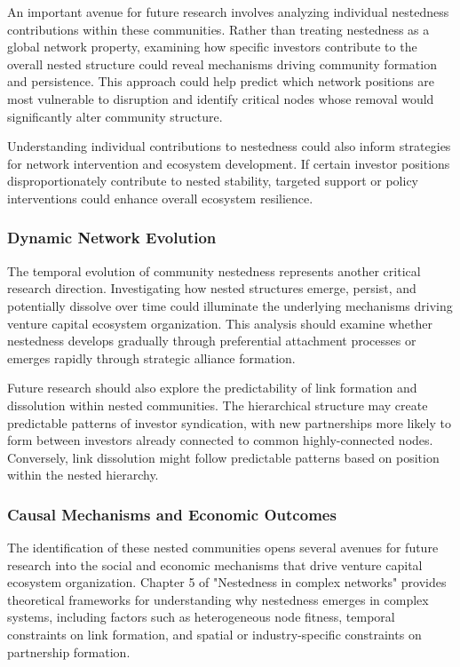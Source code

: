 An important avenue for future research involves analyzing individual nestedness contributions within these communities. Rather than treating nestedness as a global network property, examining how specific investors contribute to the overall nested structure could reveal mechanisms driving community formation and persistence. This approach could help predict which network positions are most vulnerable to disruption and identify critical nodes whose removal would significantly alter community structure.

Understanding individual contributions to nestedness could also inform strategies for network intervention and ecosystem development. If certain investor positions disproportionately contribute to nested stability, targeted support or policy interventions could enhance overall ecosystem resilience.

\subsubsection{Dynamic Network Evolution}


The temporal evolution of community nestedness represents another critical research direction. Investigating how nested structures emerge, persist, and potentially dissolve over time could illuminate the underlying mechanisms driving venture capital ecosystem organization. This analysis should examine whether nestedness develops gradually through preferential attachment processes or emerges rapidly through strategic alliance formation.

Future research should also explore the predictability of link formation and dissolution within nested communities. The hierarchical structure may create predictable patterns of investor syndication, with new partnerships more likely to form between investors already connected to common highly-connected nodes. Conversely, link dissolution might follow predictable patterns based on position within the nested hierarchy.

\subsubsection{Causal Mechanisms and Economic Outcomes}

The identification of these nested communities opens several avenues for future research into the social and economic mechanisms that drive venture capital ecosystem organization. Chapter 5 of "Nestedness in complex networks" \cite{Mariani2019} provides theoretical frameworks for understanding why nestedness emerges in complex systems, including factors such as heterogeneous node fitness, temporal constraints on link formation, and spatial or industry-specific constraints on partnership formation.

